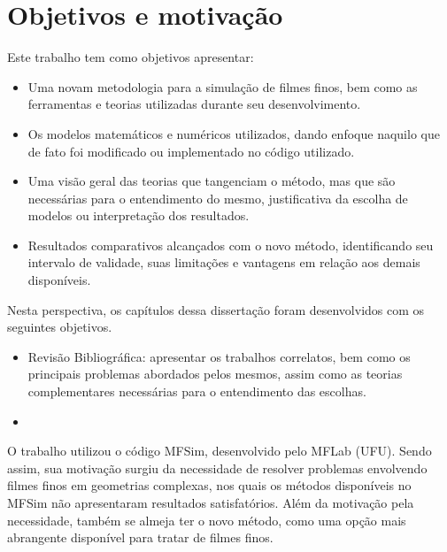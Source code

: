 \chapter{Objetivos e motivação}


Este trabalho tem como objetivos apresentar:

\begin{itemize}
    \item Uma novam metodologia para a simulação de filmes finos, bem como as ferramentas e teorias utilizadas durante seu desenvolvimento.
    \item Os modelos matemáticos e numéricos utilizados, dando enfoque naquilo que de fato foi modificado ou implementado no código utilizado.
    \item Uma visão geral das teorias que tangenciam o método, mas que são necessárias para o entendimento do mesmo, justificativa da escolha de modelos ou interpretação dos resultados.
    \item Resultados comparativos alcançados com o novo método, identificando seu intervalo de validade, suas limitações e vantagens em relação aos demais disponíveis.
\end{itemize}

Nesta perspectiva, os capítulos dessa dissertação foram desenvolvidos com os seguintes objetivos. 

\begin{itemize}
    \item Revisão Bibliográfica: apresentar os trabalhos correlatos, bem como os principais problemas abordados pelos mesmos, assim como as teorias complementares necessárias para o entendimento das escolhas.
    \item 
\end{itemize}

O trabalho utilizou o código MFSim, desenvolvido pelo MFLab (UFU). Sendo assim, sua motivação surgiu da necessidade de resolver problemas envolvendo filmes finos em geometrias complexas, nos quais os métodos disponíveis no MFSim não apresentaram resultados satisfatórios. Além da motivação pela necessidade, também se almeja ter o novo método, como uma opção mais abrangente disponível para tratar de filmes finos. 